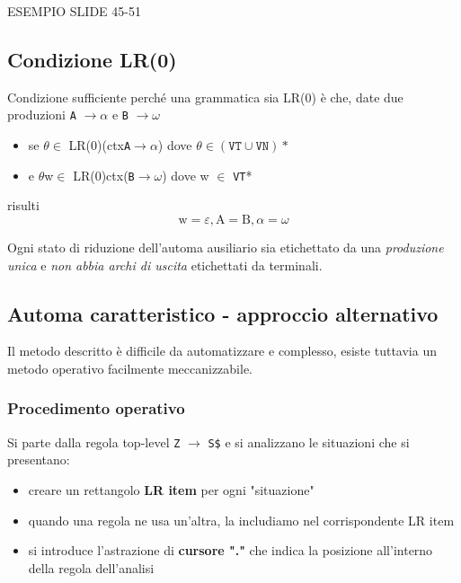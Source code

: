 ESEMPIO SLIDE 45-51

\subsection{Condizione LR(0)}
\begin{mdframed}[topline=false,bottomline=false,rightline=false]
Condizione sufficiente perché una grammatica sia LR(0) è che, date due produzioni \texttt{A} $\rightarrow \alpha$ e \texttt{B} $\rightarrow \omega$
\begin{itemize}
    \item se $\theta \in$ LR(0)(ctx\texttt{A}$ \rightarrow \alpha$) dove $\theta \in (\texttt{VT} \cup \texttt{VN})*$
    \item e $\theta $w$ \in$ LR(0)ctx(\texttt{B}$ \rightarrow \omega$) dove w $\in$ \texttt{VT}*
\end{itemize}
risulti
\begin{equation*}
    \text{w} = \varepsilon, \text{A} = \text{B}, \alpha = \omega
\end{equation*}

Ogni stato di riduzione dell'automa ausiliario sia etichettato da una \textit{produzione unica} e \textit{non abbia archi di uscita} etichettati da terminali.
\end{mdframed}

\subsection{Automa caratteristico - approccio alternativo}
Il metodo descritto è difficile da automatizzare e complesso, esiste tuttavia un metodo operativo facilmente meccanizzabile.

\subsubsection{Procedimento operativo}
Si parte dalla regola top-level \texttt{Z} $\rightarrow$ \texttt{S\$} e si analizzano le situazioni che si presentano:
\begin{itemize}
    \item creare un rettangolo \textbf{LR item} per ogni "situazione"
    \item quando una regola ne usa un'altra, la includiamo nel corrispondente LR item
    \item si introduce l'astrazione di \textbf{cursore "."} che indica la posizione all'interno della regola dell'analisi
\end{itemize}

